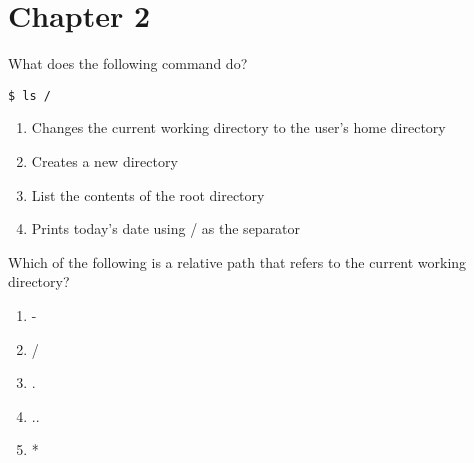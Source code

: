 \documentclass{beamer}
\begin{document}
\section{Chapter 2}



\begin{frame}[fragile]

What does the following command do?



\begin{verbatim}
$ ls /
\end{verbatim}

\begin{enumerate}[label=\Alph*)]

\item Changes the current working directory to the user's home directory

\item Creates a new directory

\item List the contents of the root directory

\item Prints today's date using / as the separator

\end{enumerate}

\end{frame}


\begin{frame}[fragile]

Which of the following is a relative path that refers to the current working directory?

\begin{enumerate}[label=\Alph*)]

\item -

\item /

\item .

\item ..

\item *

\end{enumerate}

\end{frame}
\end{document}

